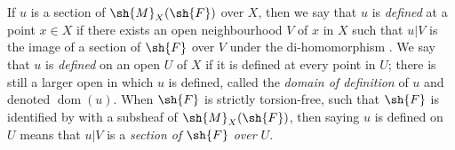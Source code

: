 \begin{env}[20.1.7]
\label{IV.20.1.7}
If $u$ is a section of $\sh{M}_X(\sh{F})$ over $X$, then we say that $u$ is \emph{defined} at a point $x\in X$ if there exists an open neighbourhood $V$ of $x$ in $X$ such that $u|V$ is the image of a section of $\sh{F}$ over $V$ under the di-homomorphism .
We say that $u$ is \emph{defined} on an open $U$ of $X$ if it is defined at every point in $U$;
there is still a larger open in which $u$ is defined, called the \emph{domain of definition} of $u$ and denoted $\operatorname{dom}(u)$.
When $\sh{F}$ is strictly torsion-free, such that $\sh{F}$ is identified by  with a subsheaf of $\sh{M}_X(\sh{F})$, then saying $u$ is defined on $U$ means that $u|V$ is a \emph{section of $\sh{F}$ over $U$}.
\end{env}

